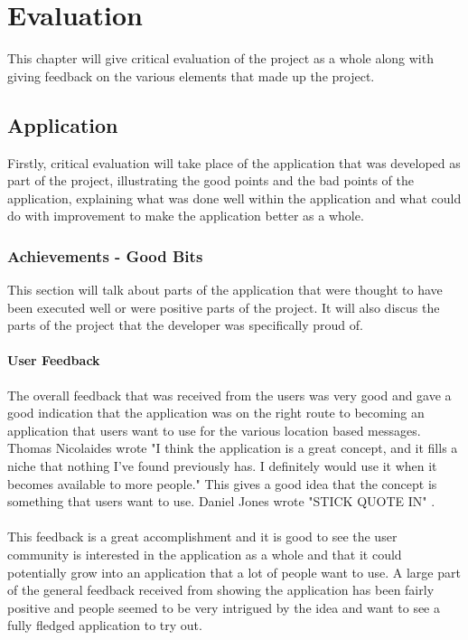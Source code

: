 \chapter{Evaluation}

This chapter will give critical evaluation of the project as a whole along with giving feedback on the various elements that made up the project.

\section{Application}

Firstly, critical evaluation will take place of the application that was developed as part of the project, illustrating the good points and the bad points of the application, explaining what was done well within the application and what could do with improvement to make the application better as a whole.

\subsection{Achievements - Good Bits}

This section will talk about parts of the application that were thought to have been executed well or were positive parts of the project. It will also discus the parts of the project that the developer was specifically proud of.

\subsubsection{User Feedback}

The overall feedback that was received from the users was very good and gave a good indication that the application was on the right route to becoming an application that users want to use for the various location based messages. Thomas Nicolaides wrote "I think the application is a great concept, and it fills a niche that nothing I've found previously has. I definitely would use it when it becomes available to more people." This gives a good idea that the concept is something that users want to use. Daniel Jones wrote "{STICK QUOTE IN}" .\\
\\
This feedback is a great accomplishment and it is good to see the user community is interested in the application as a whole and that it could potentially grow into an application that a lot of people want to use. A large part of the general feedback received from showing the application has been fairly positive and people seemed to be very intrigued by the idea and want to see a fully fledged application to try out.

